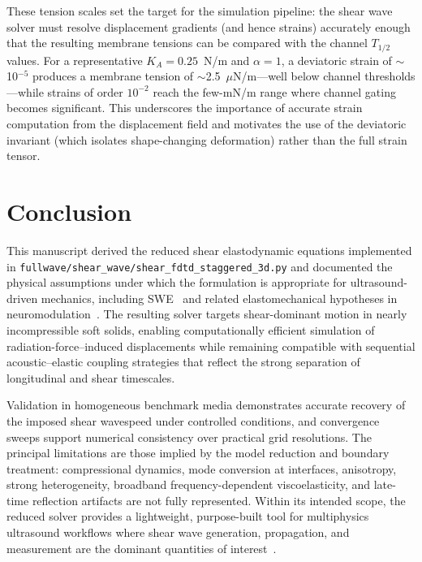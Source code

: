 \documentclass[11pt]{article}
\begin{document}
These tension scales set the target for the simulation pipeline: the shear
wave solver must resolve displacement gradients (and hence strains)
accurately enough that the resulting membrane tensions can be compared with
the channel $T_{1/2}$ values.  For a representative $K_A = 0.25$~N/m and
$\alpha = 1$, a deviatoric strain of $\sim$10$^{-5}$ produces a membrane
tension of $\sim$2.5~$\mu$N/m---well below channel thresholds---while strains
of order $10^{-2}$ reach the few-mN/m range where channel gating becomes
significant.  This underscores the importance of accurate strain
computation from the displacement field and motivates the use of the
deviatoric invariant (which isolates shape-changing deformation) rather
than the full strain tensor.


\section{Conclusion}
\label{sec:conclusion}
This manuscript derived the reduced shear elastodynamic equations implemented in
\texttt{fullwave/shear\_wave/shear\_fdtd\_staggered\_3d.py} and documented the physical assumptions under
which the formulation is appropriate for ultrasound-driven mechanics, including SWE~\cite{gennisson2013ultrasound,sigrist2017ultrasound,palmeri2011radiation}
and related elastomechanical hypotheses in neuromodulation~\cite{blackmore2019ultrasound,jones2022neuromodulation,pinton2012braintherapy}. The resulting solver
targets shear-dominant motion in nearly incompressible soft solids, enabling
computationally efficient simulation of radiation-force–induced displacements while
remaining compatible with sequential acoustic--elastic coupling strategies that
reflect the strong separation of longitudinal and shear timescales.

Validation in homogeneous benchmark media demonstrates accurate recovery of the
imposed shear wavespeed under controlled conditions, and convergence sweeps support
numerical consistency over practical grid resolutions. The principal limitations are
those implied by the model reduction and boundary treatment: compressional dynamics,
mode conversion at interfaces, anisotropy, strong heterogeneity, broadband
frequency-dependent viscoelasticity, and late-time reflection artifacts are not
fully represented. Within its intended scope, the reduced solver provides a
lightweight, purpose-built tool for multiphysics ultrasound workflows where shear
wave generation, propagation, and measurement are the dominant quantities of
interest~\cite{sarvazyan1998elasticity,bercoff2004supersonic,barr2015elastography,nightingale2002radiation,tanter2008quantitative}.
\end{document}
